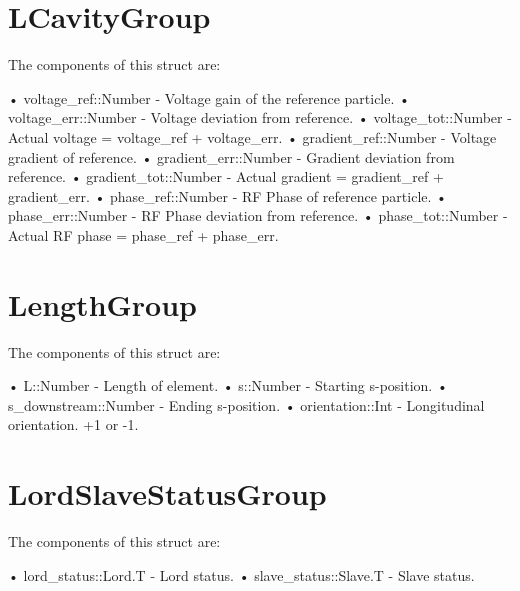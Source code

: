 \section{LCavityGroup}
\label{s:lcavity.g}

The components of this struct are:
\begin{example}
• voltage_ref::Number     - Voltage gain of the reference particle. 
• voltage_err::Number     - Voltage deviation from reference. 
• voltage_tot::Number     - Actual voltage = voltage_ref + voltage_err. 
• gradient_ref::Number    - Voltage gradient of reference.   
• gradient_err::Number    - Gradient deviation from reference. 
• gradient_tot::Number    - Actual gradient = gradient_ref + gradient_err. 
• phase_ref::Number       - RF Phase of reference particle. 
• phase_err::Number       - RF Phase deviation from reference. 
• phase_tot::Number       - Actual RF phase = phase_ref + phase_err. 
\end{example}

\section{LengthGroup}
\label{s:length.g}

The components of this struct are:
\begin{example}
• L::Number               - Length of element. 
• s::Number               - Starting s-position. 
• s_downstream::Number    - Ending s-position. 
• orientation::Int        - Longitudinal orientation. +1 or -1. 
\end{example}

\section{LordSlaveStatusGroup}
\label{s:lord.slave.g}

The components of this struct are:
\begin{example}
• lord_status::Lord.T     - Lord status. 
• slave_status::Slave.T   - Slave status. 
\end{example}


